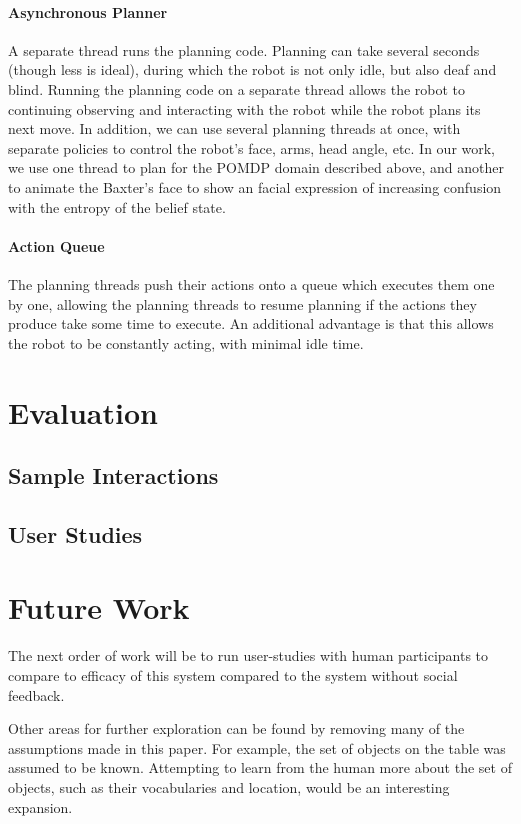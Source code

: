 \documentclass{article}
\begin{document}
\paragraph{Asynchronous Planner} A separate thread runs the planning code. Planning can take several seconds (though less is ideal), during which the robot is not only idle, but also deaf and blind. Running the planning code on a separate thread allows the robot to continuing observing and interacting with the robot while the robot plans its next move. In addition, we can use several planning threads at once, with separate policies to control the robot's face, arms, head angle, etc. In our work, we use one thread to plan for the POMDP domain described above, and another to animate the Baxter's face to show an facial expression of increasing confusion with the entropy of the belief state. 

\paragraph{Action Queue} The planning threads push their actions onto a queue which executes them one by one, allowing the planning threads to resume planning if the actions they produce take some time to execute. An additional advantage is that this allows the robot to be constantly acting, with minimal idle time. 

\section{Evaluation}

\subsection{Sample Interactions}

\subsection{User Studies}

\section{Future Work}

The next order of work will be to run user-studies with human participants to compare to efficacy of this system compared to the system without social feedback. 

Other areas for further exploration can be found by removing many of the assumptions made in this paper. For example, the set of objects on the table was assumed to be known. Attempting to learn from the human more about the set of objects, such as their vocabularies and location, would be an interesting expansion. 
\end{document}
